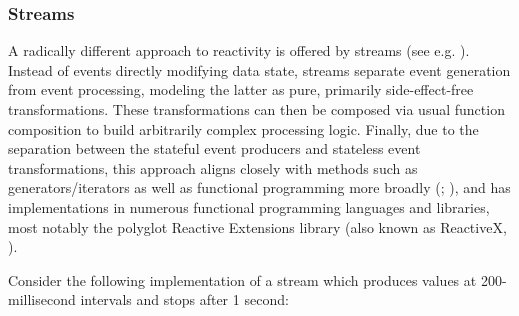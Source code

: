 \documentclass[
  openany]{book}
\theoremstyle{definition}
\theoremstyle{definition}
\theoremstyle{definition}
\theoremstyle{definition}
\theoremstyle{remark}
\begin{document}
\subsubsection{Streams}\label{streams}

A radically different approach to reactivity is offered by streams (see e.g. ). Instead of events directly modifying data state, streams separate event generation from event processing, modeling the latter as pure, primarily side-effect-free transformations. These transformations can then be composed via usual function composition to build arbitrarily complex processing logic. Finally, due to the separation between the stateful event producers and stateless event transformations, this approach aligns closely with methods such as generators/iterators as well as functional programming more broadly (; ), and has implementations in numerous functional programming languages and libraries, most notably the polyglot Reactive Extensions library (also known as ReactiveX, ).

Consider the following implementation of a stream which produces values at 200-millisecond intervals and stops after 1 second:
\end{document}
